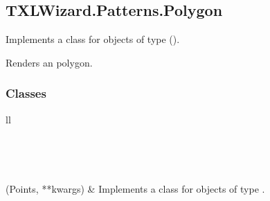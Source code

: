 \documentclass[letterpaper,10pt,english]{sphinxmanual}
\begin{document}
\subsection{TXLWizard.Patterns.Polygon}
\label{Chapters/PythonModuleReference/Patterns/TXLWizard.Patterns.Polygon:module-TXLWizard.Patterns.Polygon}\label{Chapters/PythonModuleReference/Patterns/TXLWizard.Patterns.Polygon:txlwizard-patterns-polygon}\label{Chapters/PythonModuleReference/Patterns/TXLWizard.Patterns.Polygon::doc}
Implements a class for  objects of type  ().

Renders an polygon.


\subsubsection{Classes}
\label{Chapters/PythonModuleReference/Patterns/TXLWizard.Patterns.Polygon:classes}
\begin{longtable}{ll}
\hline
\endfirsthead

%
{{}} \\
\hline
\endhead

\hline {} \\ \hline
\endfoot

\endlastfoot


{\hyperref[Chapters/PythonModuleReference/Patterns/TXLWizard.Patterns.Polygon:TXLWizard.Patterns.Polygon.Polygon]{}}(Points, **kwargs)
 & 
Implements a class for  objects of type .
\\
\hline\end{longtable}

\end{document}

